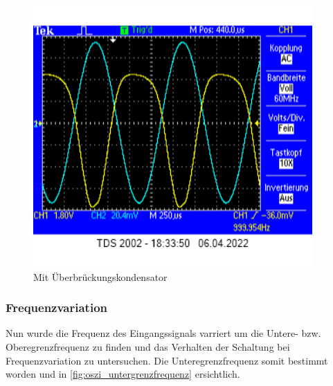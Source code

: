 \documentclass[12pt,english,ngerman]{scrartcl}
\begin{document}
\begin{figure}[H]
  \centering
    \includegraphics[width=\linewidth, height=10cm]{./figures/messungen/mituebergrenze.png}
  \caption{Mit Überbrückungskondensator}
  \label{fig:oszi_mit_uerbersteuerung}
\end{figure}

\subsubsection{Frequenzvariation}

Nun wurde die Frequenz des Eingangssignals varriert um die Untere- bzw.
Oberegrenzfrequenz zu finden und das Verhalten der Schaltung bei
Frequenzvariation zu untersuchen. Die Unteregrenzfrequenz somit bestimmt worden und in  
\autoref{fig:oszi_untergrenzfrequenz} ersichtlich.
\end{document}
